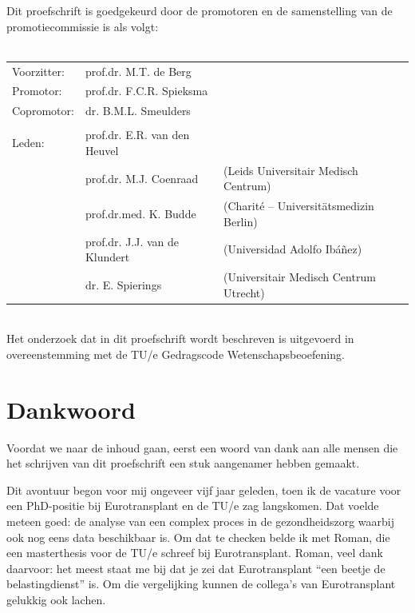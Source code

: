 \documentclass[11pt,twoside,]{book}
\begin{document}
\clearpage
\thispagestyle{empty}
\noindent
Dit proefschrift is goedgekeurd door de promotoren en de samenstelling van de
promotiecommissie is als volgt:
\\
\\
\noindent\begin{tabular}{@{}lll}


Voorzitter:
& prof.dr.
M.T.
de Berg
 & \\

Promotor:
&  prof.dr. F.C.R. Spieksma & \\

Copromotor:
&  dr. B.M.L. Smeulders & \\

\\
Leden:
&  prof.dr. E.R. van den Heuvel & \\
&  prof.dr. M.J. Coenraad & (Leids Universitair Medisch Centrum)\\
&  prof.dr.med. K. Budde & (Charité -- Universitätsmedizin Berlin)\\
&  prof.dr. J.J. van de Klundert & (Universidad Adolfo Ibáñez)\\
&  dr. E. Spierings & (Universitair Medisch Centrum Utrecht)\\
\end{tabular}\\

\vfill
\noindent
Het onderzoek dat in dit proefschrift wordt beschreven is uitgevoerd in overeenstemming met de TU/e Gedragscode Wetenschapsbeoefening.
\pagebreak



{
\setcounter{tocdepth}{1}
\tableofcontents
}
\mainmatter
\chapter*{Dankwoord}\label{dankwoord}


Voordat we naar de inhoud gaan, eerst een woord van dank aan alle mensen
die het schrijven van dit proefschrift een stuk aangenamer hebben gemaakt.

Dit avontuur begon voor mij ongeveer vijf jaar geleden, toen ik de vacature voor
een PhD-positie bij Eurotransplant en de TU/e zag langskomen. Dat voelde meteen
goed: de analyse van een complex proces in de gezondheidszorg waarbij ook nog
eens data beschikbaar is. Om dat te checken belde ik met Roman, die een
masterthesis voor de TU/e schreef bij Eurotransplant. Roman,
veel dank daarvoor: het meest staat me bij dat je zei dat Eurotransplant
``een beetje de belastingdienst'' is. Om die vergelijking kunnen
de collega's van Eurotransplant gelukkig ook lachen.
\end{document}
